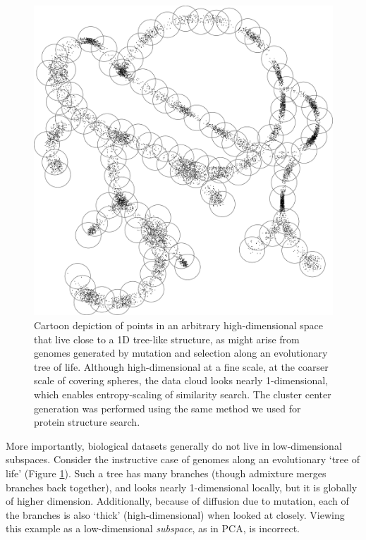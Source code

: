 \documentclass[review,preprint,12pt]{elsarticle}
\theoremstyle{definition}
\theoremstyle{remark}
\numberwithin{equation}{section}
\begin{document}
\begin{figure}[p]
    \vspace{-5em}
    \centering
    \centerline{\includegraphics[width=8in]{assets/treepoints/treepoints2D_clusters.png}}
    \caption{Cartoon depiction of points in an arbitrary high-dimensional space that live close to a 1D tree-like structure, as might arise from genomes generated by mutation and selection along an evolutionary tree of life. 
Although high-dimensional at a fine scale, at the coarser scale of covering spheres, the data cloud looks nearly 1-dimensional, which enables entropy-scaling of similarity search. The cluster center generation was performed using the same method we used for protein structure search.}
    \label{fig:tree}
\end{figure}

More importantly, biological datasets generally do not live in low-dimensional subspaces.
Consider the instructive case of genomes along an evolutionary `tree of life' (Figure \ref{fig:tree}).
Such a tree has many branches (though admixture merges branches back together),
and looks nearly 1-dimensional locally, but it is globally of higher dimension.
Additionally, because of diffusion due to mutation, each of the branches is also `thick' (high-dimensional) when looked at closely.
Viewing this example as a low-dimensional \textit{subspace}, as in PCA, is 
incorrect.
\end{document}
